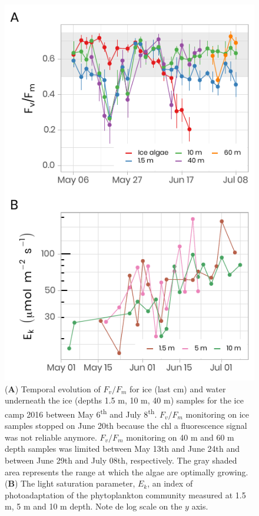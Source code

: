 \documentclass[essd, manuscript]{copernicus}
\begin{document}
\begin{figure}[H]
	\centering
	\includegraphics[scale = 1]{../../../../graphs/fig13.pdf}
	\caption{(\textbf{A}) Temporal evolution of $F_v/F_m$ for ice (last cm) and water underneath the ice (depths 1.5 m, 10 m, 40 m) samples for the ice camp 2016 between May 6\textsuperscript{th} and July 8\textsuperscript{th}. $F_v/F_m$ monitoring on ice samples stopped on June 20th because the chl a fluorescence signal was not reliable anymore. $F_v/F_m$ monitoring on 40 m and 60 m depth samples was limited between May 13th and June 24th and between June 29th and July 08th, respectively. The gray shaded area represents the range at which the algae are optimally growing. (\textbf{B}) The light saturation parameter, $E_k$, an index of photoadaptation of the phytoplankton community measured at 1.5 m, 5 m and 10 m depth. Note de log scale on the $y$ axis.}
\end{figure}
\end{document}
